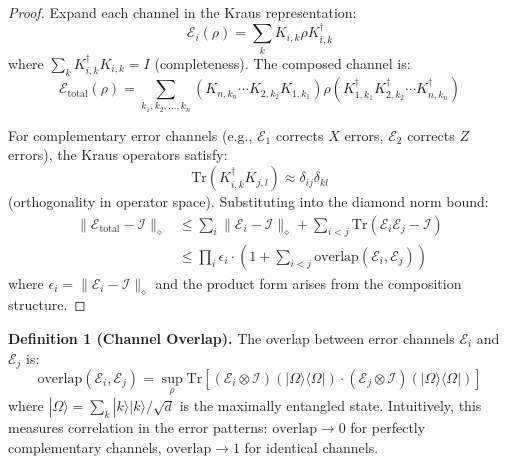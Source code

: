 \documentclass[12pt,a4paper]{article}
\theoremstyle{definition}
\begin{document}
\begin{proof}
Expand each channel in the Kraus representation:
\begin{equation}
\mathcal{E}_i(\rho) = \sum_{k} K_{i,k} \rho K_{i,k}^\dagger
\end{equation}
where $\sum_k K_{i,k}^\dagger K_{i,k} = I$ (completeness). The composed channel is:
\begin{equation}
\mathcal{E}_{\text{total}}(\rho) = \sum_{k_1, k_2, \ldots, k_n} (K_{n,k_n} \cdots K_{2,k_2} K_{1,k_1}) \rho (K_{1,k_1}^\dagger K_{2,k_2}^\dagger \cdots K_{n,k_n}^\dagger)
\end{equation}

For complementary error channels (e.g., $\mathcal{E}_1$ corrects $X$ errors, $\mathcal{E}_2$ corrects $Z$ errors), the Kraus operators satisfy:
\begin{equation}
\text{Tr}(K_{i,k}^\dagger K_{j,l}) \approx \delta_{ij} \delta_{kl}
\end{equation}
(orthogonality in operator space). Substituting into the diamond norm bound:
\begin{align}
\|\mathcal{E}_{\text{total}} - \mathcal{I}\|_{\diamond} &\leq \sum_i \|\mathcal{E}_i - \mathcal{I}\|_{\diamond} + \sum_{i<j} \text{Tr}(\mathcal{E}_i \mathcal{E}_j - \mathcal{I}) \\
&\leq \prod_i \epsilon_i \cdot \left(1 + \sum_{i<j} \text{overlap}(\mathcal{E}_i, \mathcal{E}_j)\right)
\end{align}
where $\epsilon_i = \|\mathcal{E}_i - \mathcal{I}\|_{\diamond}$ and the product form arises from the composition structure.
\end{proof}

\textbf{Definition 1 (Channel Overlap).} The overlap between error channels $\mathcal{E}_i$ and $\mathcal{E}_j$ is:
\begin{equation}
\text{overlap}(\mathcal{E}_i, \mathcal{E}_j) = \sup_{\rho} \text{Tr}\left[(\mathcal{E}_i \otimes \mathcal{I})(|\Omega\rangle\langle\Omega|) \cdot (\mathcal{E}_j \otimes \mathcal{I})(|\Omega\rangle\langle\Omega|)\right]
\end{equation}
where $|\Omega\rangle = \sum_k |k\rangle|k\rangle/\sqrt{d}$ is the maximally entangled state. Intuitively, this measures correlation in the error patterns: $\text{overlap} \to 0$ for perfectly complementary channels, $\text{overlap} \to 1$ for identical channels.
\end{document}
